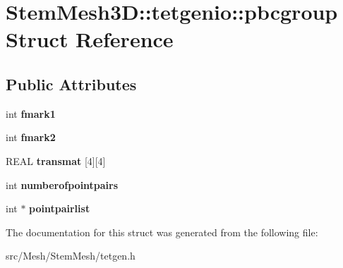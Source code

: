 \hypertarget{structStemMesh3D_1_1tetgenio_1_1pbcgroup}{}\section{Stem\+Mesh3D\+:\+:tetgenio\+:\+:pbcgroup Struct Reference}
\label{structStemMesh3D_1_1tetgenio_1_1pbcgroup}
\subsection*{Public Attributes}
\begin{DoxyCompactItemize}
\item 
\mbox{\label{structStemMesh3D_1_1tetgenio_1_1pbcgroup_aef9814e8e96446f7d4c5102ae2b1192b}} 
int {\bfseries fmark1}
\item 
\mbox{\label{structStemMesh3D_1_1tetgenio_1_1pbcgroup_ab3eb6babb3d15eba5b89065798b7b756}} 
int {\bfseries fmark2}
\item 
\mbox{\label{structStemMesh3D_1_1tetgenio_1_1pbcgroup_a98b0453de3a8e630eccfd43d9fc7f505}} 
R\+E\+AL {\bfseries transmat} \mbox{[}4\mbox{]}\mbox{[}4\mbox{]}
\item 
\mbox{\label{structStemMesh3D_1_1tetgenio_1_1pbcgroup_a2912d61a7ff4905253af1510e75700d8}} 
int {\bfseries numberofpointpairs}
\item 
\mbox{\label{structStemMesh3D_1_1tetgenio_1_1pbcgroup_ad6ece5d0e2db6b0c38328ee72b0b419c}} 
int $\ast$ {\bfseries pointpairlist}
\end{DoxyCompactItemize}


The documentation for this struct was generated from the following file\+:\begin{DoxyCompactItemize}
\item 
src/\+Mesh/\+Stem\+Mesh/tetgen.\+h\end{DoxyCompactItemize}
